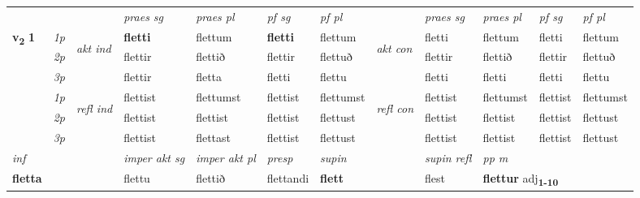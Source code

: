 \begin{longtable}[l]{X>{\footnotesize\itshape}llXXXXlXXXX}
 & &   & \textit{praes sg}  & \textit{praes pl}    & \textit{ pf sg} & \textit{pf pl} & & \textit{praes sg}  & \textit{praes pl}    & \textit{pf sg} & \textit{pf pl }  \\ \cmidrule{4-7} \cmidrule{9-12}
 \multirow{2}{*}{{{\textbf{v{\textsubscript{2}}} \Large{\textbf{1}}}}}  & 1p & \multirow{3}{*}{\begin{turn}{90}\textit{akt ind}\end{turn}} & \textbf{fletti} & flettum & \textbf{fletti} & flettum & \multirow{3}{*}{\begin{turn}{90}\textit{akt con}\end{turn}} &fletti & flettum & fletti & flettum\\*
 & 2p &  &  flettir  & flettið & flettir & flettuð & & flettir & flettið & flettir & flettuð \\*
 & 3p &  & flettir & fletta & fletti & flettu & & fletti & fletti& fletti & flettu \\*
\cmidrule{4-7} \cmidrule{9-12}
 & 1p & \multirow{3}{*}{\begin{turn}{90}\textit{refl ind}\end{turn}}  & flettist & flettumst & flettist & flettumst & \multirow{3}{*}{\begin{turn}{90}\textit{refl con}\end{turn}}  &flettist & flettumst & flettist & flettumst \\*
 & 2p &  & flettist & flettist & flettist & flettust & &flettist & flettist & flettist & flettust \\*
 & 3p  & & flettist & flettast & flettist & flettust & & flettist & flettist& flettist & flettust \\*
\cmidrule{4-7} \cmidrule{9-12}

   {\textit{inf}} & &  & \textit{imper akt sg} & \textit{imper akt pl}   & \textit{presp} & \textit{supin} && \textit{supin refl} & \textit{pp m} \\*
  {\textbf{fletta}} & && flettu  & flettið   & flettandi &  \textbf{flett} && flest & \multicolumn{2}{l}{\textbf{flettur} adj\textbf{\textsubscript{1-10}}} \\*

\midrule


\end{longtable}
